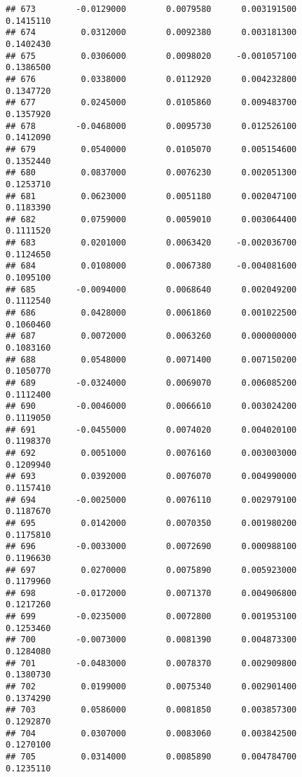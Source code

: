 \documentclass[
]{article}
\begin{document}
\begin{verbatim}
## 673        -0.0129000        0.0079580      0.003191500             0.1415110
## 674         0.0312000        0.0092380      0.003181300             0.1402430
## 675         0.0306000        0.0098020     -0.001057100             0.1386500
## 676         0.0338000        0.0112920      0.004232800             0.1347720
## 677         0.0245000        0.0105860      0.009483700             0.1357920
## 678        -0.0468000        0.0095730      0.012526100             0.1412090
## 679         0.0540000        0.0105070      0.005154600             0.1352440
## 680         0.0837000        0.0076230      0.002051300             0.1253710
## 681         0.0623000        0.0051180      0.002047100             0.1183390
## 682         0.0759000        0.0059010      0.003064400             0.1111520
## 683         0.0201000        0.0063420     -0.002036700             0.1124650
## 684         0.0108000        0.0067380     -0.004081600             0.1095100
## 685        -0.0094000        0.0068640      0.002049200             0.1112540
## 686         0.0428000        0.0061860      0.001022500             0.1060460
## 687         0.0072000        0.0063260      0.000000000             0.1083160
## 688         0.0548000        0.0071400      0.007150200             0.1050770
## 689        -0.0324000        0.0069070      0.006085200             0.1112400
## 690        -0.0046000        0.0066610      0.003024200             0.1119050
## 691        -0.0455000        0.0074020      0.004020100             0.1198370
## 692         0.0051000        0.0076160      0.003003000             0.1209940
## 693         0.0392000        0.0076070      0.004990000             0.1157410
## 694        -0.0025000        0.0076110      0.002979100             0.1187670
## 695         0.0142000        0.0070350      0.001980200             0.1175810
## 696        -0.0033000        0.0072690      0.000988100             0.1196630
## 697         0.0270000        0.0075890      0.005923000             0.1179960
## 698        -0.0172000        0.0071370      0.004906800             0.1217260
## 699        -0.0235000        0.0072800      0.001953100             0.1253460
## 700        -0.0073000        0.0081390      0.004873300             0.1284080
## 701        -0.0483000        0.0078370      0.002909800             0.1380730
## 702         0.0199000        0.0075340      0.002901400             0.1374290
## 703         0.0586000        0.0081850      0.003857300             0.1292870
## 704         0.0307000        0.0083060      0.003842500             0.1270100
## 705         0.0314000        0.0085890      0.004784700             0.1235110

\end{verbatim}
\end{document}
